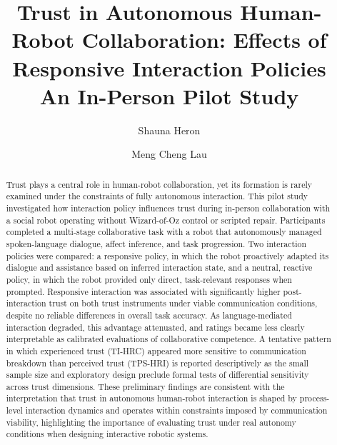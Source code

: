 \documentclass[
  authoryear,
  doubleblind,
  3p]{elsarticle}
\begin{document}
\begin{frontmatter}
\title{Trust in Autonomous Human-Robot Collaboration: Effects of
Responsive Interaction Policies \\\large{An In-Person Pilot Study} }
\author[1]{Shauna Heron%
%
}
\author[2]{Meng Cheng Lau%
%
}




        
\begin{abstract}
Trust plays a central role in human-robot collaboration, yet its
formation is rarely examined under the constraints of fully autonomous
interaction. This pilot study investigated how interaction policy
influences trust during in-person collaboration with a social robot
operating without Wizard-of-Oz control or scripted repair. Participants
completed a multi-stage collaborative task with a robot that
autonomously managed spoken-language dialogue, affect inference, and
task progression. Two interaction policies were compared: a responsive
policy, in which the robot proactively adapted its dialogue and
assistance based on inferred interaction state, and a neutral, reactive
policy, in which the robot provided only direct, task-relevant responses
when prompted. Responsive interaction was associated with significantly
higher post-interaction trust on both trust instruments under viable
communication conditions, despite no reliable differences in overall
task accuracy. As language-mediated interaction degraded, this advantage
attenuated, and ratings became less clearly interpretable as calibrated
evaluations of collaborative competence. A tentative pattern in which
experienced trust (TI-HRC) appeared more sensitive to communication
breakdown than perceived trust (TPS-HRI) is reported descriptively as
the small sample size and exploratory design preclude formal tests of
differential sensitivity across trust dimensions. These preliminary
findings are consistent with the interpretation that trust in autonomous
human-robot interaction is shaped by process-level interaction dynamics
and operates within constraints imposed by communication viability,
highlighting the importance of evaluating trust under real autonomy
conditions when designing interactive robotic systems.
\end{abstract}


\end{frontmatter}
\end{document}
